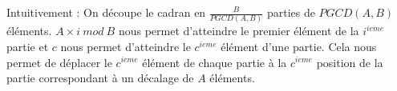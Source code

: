 Intuitivement : On découpe le cadran en $\frac{B}{PGCD(A,B)}$ parties de $PGCD(A,B)$ éléments. 
$A\times i\ mod\ B$ nous permet d'atteindre le premier élément de la $i^{ieme}$ partie et $c$ nous permet d'atteindre le $c^{ieme}$ élément d'une partie. 
Cela nous permet de déplacer le $c^{ieme}$ élément de chaque partie à la $c^{ieme}$ position de la partie correspondant à un décalage de $A$ éléments.